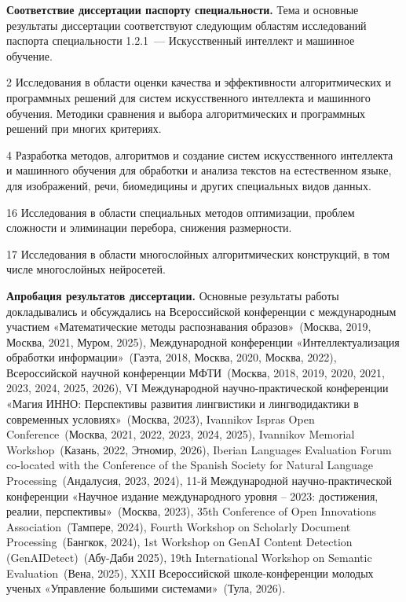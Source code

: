 \documentclass{dissert}
\newcommand{\paragraph}[1]{\noindent\textbf{#1}\quad}
\begin{document}
\paragraph{Соответствие диссертации паспорту специальности.}
Тема и основные результаты диссертации соответствуют следующим областям исследований паспорта специальности 1.2.1~--- Искусственный интеллект и машинное обучение.

2 Исследования в области оценки качества и эффективности алгоритмических и программных решений для систем искусственного интеллекта и машинного обучения. Методики сравнения и выбора алгоритмических и программных решений при многих критериях.

4 Разработка методов, алгоритмов и создание систем искусственного интеллекта и машинного обучения для обработки и анализа текстов на естественном языке, для изображений, речи, биомедицины и других специальных видов данных.

16 Исследования в области специальных методов оптимизации, проблем сложности и элиминации перебора, снижения размерности.

17 Исследования в области многослойных алгоритмических конструкций, в том числе многослойных нейросетей.

\paragraph{Апробация результатов диссертации.}
Основные результаты работы докладывались и обсуждались на Всероссийской конференции с международным участием «Математические методы распознавания образов»~(Москва, 2019, Москва, 2021, Муром, 2025), Международной конференции «Интеллектуализация обработки информации»~(Гаэта, 2018, Москва, 2020, Москва, 2022), Всероссийской научной конференции МФТИ~(Москва, 2018, 2019, 2020, 2021, 2023, 2024, 2025, 2026), VI Международной научно-практической конференции «Магия ИННО: Перспективы развития лингвистики и лингводидактики в современных условиях»~(Москва, 2023), Ivannikov Ispras Open Conference~(Москва, 2021, 2022, 2023, 2024, 2025), Ivannikov Memorial Workshop~(Казань, 2022, Этномир, 2026), Iberian Languages Evaluation Forum co-located with the Conference of the Spanish Society for Natural Language Processing~(Андалусия, 2023, 2024), 11-й Международной научно-практической конференции «Научное издание международного уровня – 2023: достижения, реалии, перспективы»~(Москва, 2023), 35th Conference of Open Innovations Association~(Тампере, 2024), Fourth Workshop on Scholarly Document Processing~(Бангкок, 2024), 1st Workshop on GenAI Content Detection (GenAIDetect)~(Абу-Даби 2025), 19th International Workshop on Semantic Evaluation~(Вена, 2025), XXII Всероссийской школе-конференции молодых ученых «Управление большими системами»~(Тула, 2026).
\end{document}
